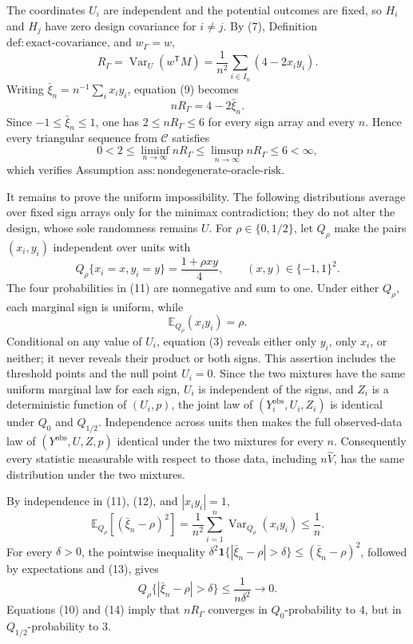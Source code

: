 The coordinates \(U_i\) are independent and the potential outcomes are fixed, so \(H_i\) and \(H_j\) have zero design covariance for \(i\ne j\).  By (7), Definition \(\mathrm{def:exact\text{-}covariance}\), and \(w_\Gamma=w\),
\[
R_\Gamma
=\operatorname{Var}_U(w^{\mathsf T}M)
=\frac1{n^2}\sum_{i\in I_n}(4-2x_i y_i).
\tag{9}
\]
Writing \(\bar\xi_n=n^{-1}\sum_i x_i y_i\), equation (9) becomes
\[
nR_\Gamma=4-2\bar\xi_n.
\tag{10}
\]
Since \(-1\le\bar\xi_n\le1\), one has \(2\le nR_\Gamma\le6\) for every sign array and every \(n\).  Hence every triangular sequence from \(\mathcal C\) satisfies
\[
0<2\le\liminf_{n\to\infty}nR_\Gamma
\le\limsup_{n\to\infty}nR_\Gamma\le6<\infty,
\]
which verifies Assumption \(\mathrm{ass:nondegenerate\text{-}oracle\text{-}risk}\).

It remains to prove the uniform impossibility.  The following distributions average over fixed sign arrays only for the minimax contradiction; they do not alter the design, whose sole randomness remains \(U\).  For \(\rho\in\{0,1/2\}\), let \(Q_\rho\) make the pairs \((x_i,y_i)\) independent over units with
\[
Q_\rho\{x_i=x,y_i=y\}=\frac{1+\rho xy}{4},
\qquad (x,y)\in\{-1,1\}^2.
\tag{11}
\]
The four probabilities in (11) are nonnegative and sum to one.  Under either \(Q_\rho\), each marginal sign is uniform, while
\[
\mathbb E_{Q_\rho}(x_i y_i)=\rho.
\tag{12}
\]
Conditional on any value of \(U_i\), equation (3) reveals either only \(y_i\), only \(x_i\), or neither; it never reveals their product or both signs.  This assertion includes the threshold points and the null point \(U_i=0\).  Since the two mixtures have the same uniform marginal law for each sign, \(U_i\) is independent of the signs, and \(Z_i\) is a deterministic function of \((U_i,p)\), the joint law of \((Y_i^{\mathrm{obs}},U_i,Z_i)\) is identical under \(Q_0\) and \(Q_{1/2}\).  Independence across units then makes the full observed-data law of \((Y^{\mathrm{obs}},U,Z,p)\) identical under the two mixtures for every \(n\).  Consequently every statistic measurable with respect to those data, including \(n\widehat V\), has the same distribution under the two mixtures.

By independence in (11), (12), and \(|x_i y_i|=1\),
\[
\mathbb E_{Q_\rho}\!\left[(\bar\xi_n-\rho)^2\right]
=\frac1{n^2}\sum_{i=1}^n\operatorname{Var}_{Q_\rho}(x_i y_i)
\le\frac1n.
\tag{13}
\]
For every \(\delta>0\), the pointwise inequality
\(\delta^2\mathbf 1\{|\bar\xi_n-\rho|>\delta\}\le
(\bar\xi_n-\rho)^2\), followed by expectations and (13), gives
\[
Q_\rho\{|\bar\xi_n-\rho|>\delta\}
\le\frac1{n\delta^2}\longrightarrow0.
\tag{14}
\]
Equations (10) and (14) imply that \(nR_\Gamma\) converges in \(Q_0\)-probability to \(4\), but in \(Q_{1/2}\)-probability to \(3\).

